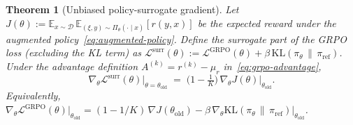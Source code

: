 \documentclass[11pt]{article}
\newtheorem{theorem}{Theorem}
\theoremstyle{definition}
\theoremstyle{remark}
\newcommand{\E}{\mathbb{E}}
\newcommand{\KL}{\mathrm{KL}}
\newcommand{\D}{\mathcal{D}}
\newcommand{\Loss}{\mathcal{L}}
\newcommand{\old}{\mathrm{old}}
\begin{document}
\begin{theorem}[Unbiased policy-surrogate gradient]
\label{thm:unbiased}
Let $J(\theta) := \E_{x\sim\D}\,\E_{(\xi,y)\sim\Pi_\theta(\cdot\mid x)}[r(y,x)]$
be the expected reward under the augmented policy~\eqref{eq:augmented-policy}.
Define the surrogate part of the GRPO loss (excluding the KL term) as
$\Loss^{\mathrm{surr}}(\theta) := \Loss^{\mathrm{GRPO}}(\theta)
  + \beta\,\KL(\pi_\theta\,\|\,\pi_{\mathrm{ref}})$.
Under the advantage definition $A^{(k)} = r^{(k)} - \mu_r$
in~\eqref{eq:grpo-advantage},
\begin{equation}
\nabla_\theta \Loss^{\mathrm{surr}}(\theta)\Big|_{\theta=\theta_\old}
  \;=\;
\Big(1 - \tfrac{1}{K}\Big)\,\nabla_\theta J(\theta)\Big|_{\theta_\old}.
\label{eq:unbiased}
\end{equation}
Equivalently,
$\nabla_\theta \Loss^{\mathrm{GRPO}}(\theta)\big|_{\theta_\old}
   = (1 - 1/K)\,\nabla J(\theta_\old)
   - \beta\,\nabla_\theta \KL(\pi_\theta\,\|\,\pi_{\mathrm{ref}})\big|_{\theta_\old}$.
\end{theorem}
\end{document}
